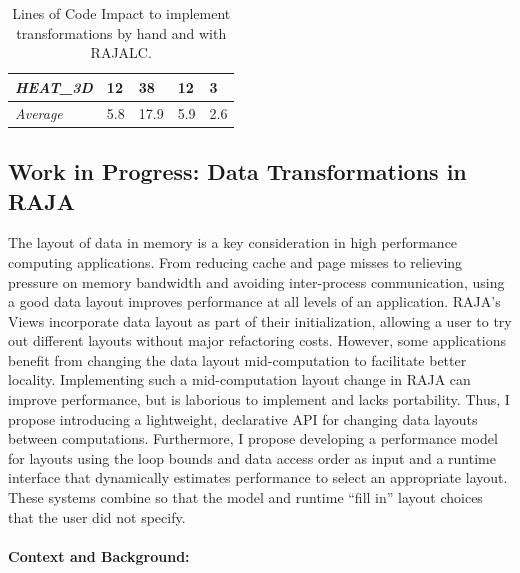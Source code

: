 \documentclass{article}
\begin{document}
\begin{table}[t]
\begin{tabular}{|l|l|l|l|l|}
    \\
    \textit{HEAT\_3D}        & 12                                              & 38                                           & 12                                             & 3                                            \\ \hline
    \textit{Average}        & 5.8                                              & 17.9                                           & 5.9                                            & 2.6                                            \\ \hline
    \end{tabular}
    \caption{Lines of Code Impact to implement transformations by hand and with RAJALC.}\label{sloc}
    \end{table}



\subsection{Work in Progress: Data Transformations in RAJA}
\label{Sec:Work2}
The layout of data in memory is a key consideration in high performance computing applications.
From reducing cache and page misses to relieving pressure on memory bandwidth and avoiding inter-process communication, using a good data layout improves performance at all levels of an application.
RAJA's Views incorporate data layout as part of their initialization, allowing a user to try out different layouts without major refactoring costs.
However, some applications benefit from changing the data layout mid-computation to facilitate better locality.
Implementing such a mid-computation layout change in RAJA can improve performance, but is laborious to implement and lacks portability.
Thus, I propose introducing a lightweight, declarative API for changing data layouts between computations.
Furthermore, I propose developing a performance model for layouts using the loop bounds and data access order as input and a runtime interface that dynamically estimates performance to select an appropriate layout. 
These systems combine so that the model and runtime \enquote{fill in} layout choices that the user did not specify.

\paragraph{Context and Background:}
\end{document}
